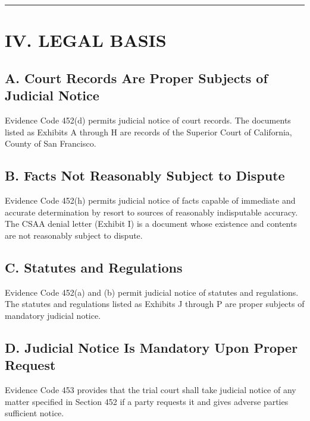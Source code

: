\begin{center}\rule{0.5\linewidth}{0.5pt}\end{center}

\section{IV. LEGAL BASIS}\label{iv.-legal-basis}

\subsection{A. Court Records Are Proper Subjects of Judicial Notice}\label{a.-court-records-are-proper-subjects-of-judicial-notice}

Evidence Code \textsection{} 452(d) permits judicial notice of court records. The documents listed as Exhibits A through H are records of the Superior Court of California, County of San Francisco.

\subsection{B. Facts Not Reasonably Subject to Dispute}\label{b.-facts-not-reasonably-subject-to-dispute}

Evidence Code \textsection{} 452(h) permits judicial notice of facts capable of immediate and accurate determination by resort to sources of reasonably indisputable accuracy. The CSAA denial letter (Exhibit I) is a document whose existence and contents are not reasonably subject to dispute.

\subsection{C. Statutes and Regulations}\label{c.-statutes-and-regulations}

Evidence Code \textsection{}\textsection{} 452(a) and (b) permit judicial notice of statutes and regulations. The statutes and regulations listed as Exhibits J through P are proper subjects of mandatory judicial notice.

\subsection{D. Judicial Notice Is Mandatory Upon Proper Request}\label{d.-judicial-notice-is-mandatory-upon-proper-request}

Evidence Code \textsection{} 453 provides that the trial court shall take judicial notice of any matter specified in Section 452 if a party requests it and gives adverse parties sufficient notice.

